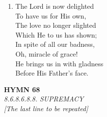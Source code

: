 \begin{enumerate}
    \item The Lord is now delighted \\
        To have us for His own, \\
        The love no longer slighted \\
        Which He to us has shown; \\
        In spite of all our badness, \\
        Oh, miracle of grace! \\
        He brings us in with gladness \\
        Before His Father's face.

\end{enumerate}

\newpage
\begin{center}
    {\Large \textbf{HYMN 68}}
    \\
    \textit{8.6.8.6.8.8. SUPREMACY}
    \\
    \textit{\small [The last line to be repeated]}
\end{center}
\vspace{1em}

